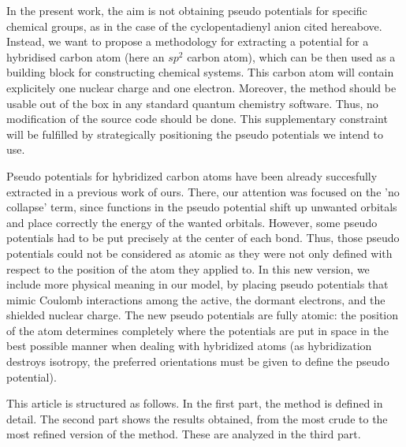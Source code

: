 \documentclass[journal=jctcce,manuscript=article]{achemso}
\begin{document}

In the present work, the aim is not obtaining pseudo potentials for  specific
chemical groups, as in the case of the cyclopentadienyl anion cited hereabove.
Instead, we want to propose a methodology for extracting a potential for
a hybridised carbon atom (here an $sp^2$ carbon atom), which can be then
used as a building block for constructing chemical systems. This carbon atom
will contain explicitely one nuclear charge and one electron.
Moreover, the method should be usable 
out of the box in any standard quantum chemistry software.
Thus, no modification of the source code should be done.
This supplementary constraint will be fulfilled by strategically positioning the pseudo potentials
we intend to use. 

Pseudo potentials for hybridized carbon
atoms have been already succesfully extracted in a previous work of ours.\cite{drujon_pseudopotentials_2013}
There, our attention was focused on the 'no collapse' term, since 
functions in the pseudo potential shift up unwanted orbitals and place correctly the energy of the
wanted orbitals.
However, some pseudo potentials had to be put precisely at the center
of each bond.
Thus, those pseudo potentials could not be considered as atomic as they were not only defined
with respect to the position of the atom they applied to.
In this new version, we include more physical meaning in our model, 
by placing pseudo potentials that mimic Coulomb interactions among the active,
the dormant electrons, and the shielded nuclear charge. 
The new pseudo potentials are fully atomic: the position of the atom
determines completely where the potentials are put in space in the best possible manner
when dealing with hybridized atoms (as hybridization destroys isotropy, the preferred orientations
must be given to define the pseudo potential).

This article is structured as follows.
In the first part, the method is defined in detail.
The second part shows the results obtained, from the most crude to the most refined
version of the method.
These are analyzed in the third part.
\end{document}

